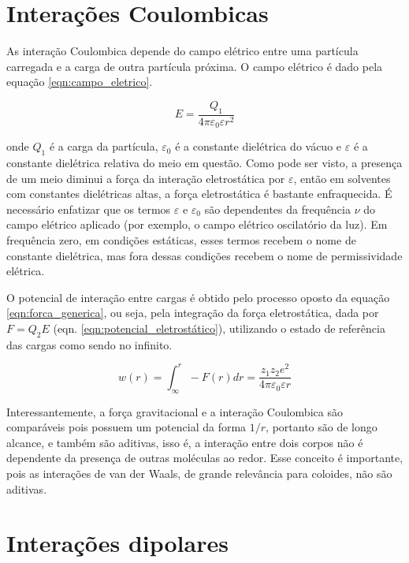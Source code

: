 	\section{Interações Coulombicas}
	
	As interação Coulombica depende do campo elétrico entre uma partícula carregada e a carga de outra partícula próxima. O campo elétrico é dado pela equação \ref{eqn:campo_eletrico}.
	
	\begin{equation}
		E = \dfrac{Q_1}{4\pi\varepsilon_0\varepsilon r^2}
		\label{eqn:campo_eletrico}
	\end{equation}

	\noindent onde \(Q_1\) é a carga da partícula, \(\varepsilon_0\) é a constante dielétrica do vácuo e \(\varepsilon\) é a constante dielétrica relativa do meio em questão. Como pode ser visto, a presença de um meio diminui a força da interação eletrostática por \(\varepsilon\), então em solventes com constantes dielétricas altas, a força eletrostática é bastante enfraquecida. É necessário enfatizar que os termos \(\varepsilon\) e \(\varepsilon_0\) são dependentes da frequência \(\nu\) do campo elétrico aplicado (por exemplo, o campo elétrico oscilatório da luz). Em frequência zero, em condições estáticas, esses termos recebem o nome de constante dielétrica, mas fora dessas condições recebem o nome de permissividade elétrica.
	
	O potencial de interação entre cargas é obtido pelo processo oposto da equação \ref{eqn:forca_generica}, ou seja, pela integração da força eletrostática, dada por \(F = Q_2 E\) (eqn. \ref{eqn:potencial_eletrostático}), utilizando o estado de referência das cargas como sendo no infinito.
	
	\begin{equation}
		w(r) = \int_\infty^r -F(r)dr = \dfrac{z_1z_2e^2}{4\pi\varepsilon_0\varepsilon r}
		\label{eqn:potencial_eletrostático}
	\end{equation}
	
	Interessantemente, a força gravitacional e a interação Coulombica são comparáveis pois possuem um potencial da forma \(1/r\), portanto são de longo alcance, e também são aditivas, isso é, a interação entre dois corpos não é dependente da presença de outras moléculas ao redor. Esse conceito é importante, pois as interações de van der Waals, de grande relevância para coloides, não são aditivas. %
	
	\section{Interações dipolares}
	
